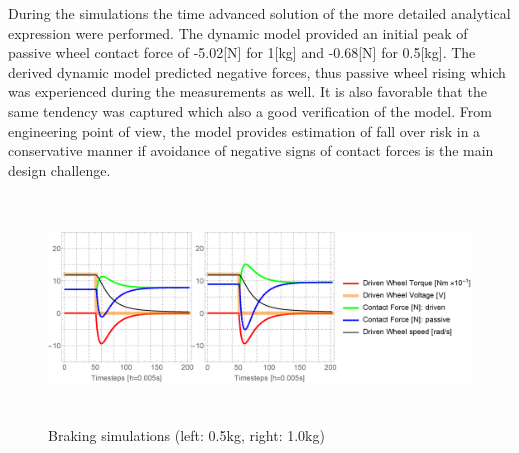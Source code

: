 \documentclass[12pt,english]{article}
\begin{document}
During the simulations the time advanced solution of the more detailed analytical expression were performed. The dynamic model provided an initial peak of passive wheel contact force of -5.02[N] for 1[kg] and -0.68[N] for 0.5[kg]. The derived dynamic model predicted negative forces, thus passive wheel rising which was experienced during the measurements as well. It is also favorable that the same tendency was captured which also a good verification of the model. From engineering point of view, the model provides estimation of fall over risk in a conservative manner if avoidance of negative signs of contact forces is the main design challenge.

\begin{figure}[htb!]
	\centering
	\includegraphics[height=6cm]{figures/simulation_0_5_1_0}
	\caption{Braking simulations (left: 0.5kg, right: 1.0kg)}
	\label{simulation_0_5_1_0}
\end{figure}
\end{document}
